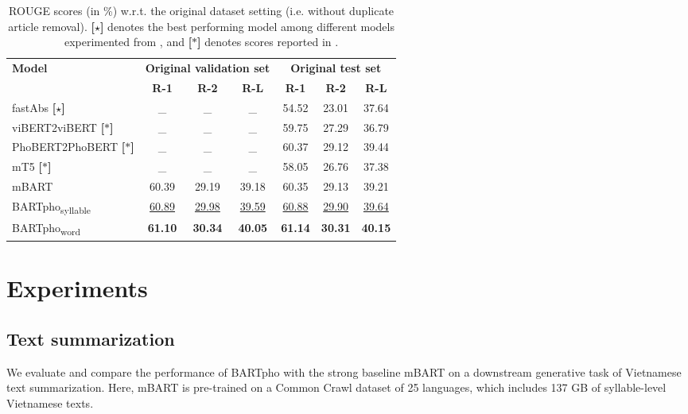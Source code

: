\documentclass[a4paper]{article}
\begin{document}
\begin{table*}[!t]
\centering
\caption{ROUGE scores (in \%) w.r.t. the original dataset setting (i.e.  {without} duplicate article removal). \textbf{[$\star$]} denotes the best performing model among different  models experimented from \cite{9023886}, and \textbf{[$\ast$]} denotes scores reported in \cite{vietsum}.}
\def\arraystretch{1.1}
\begin{tabular}{l|c|c|c|c|c|c}
\hline
\multirow{2}{*}{\textbf{Model}}  & \multicolumn{3}{c|}{\textbf{Original validation set}} & \multicolumn{3}{c}{\textbf{Original test set}}\\
\cline{2-7}
& \textbf{R-1} & \textbf{R-2}   & \textbf{R-L} & \textbf{R-1} & \textbf{R-2}   & \textbf{R-L} \\
\hline
fastAbs \textbf{[$\star$]} & \_ & \_ & \_ & 54.52 & 23.01 & 37.64 \\
viBERT2viBERT \textbf{[$\ast$]} & \_ & \_ & \_ & 59.75 & 27.29 & 36.79 \\
PhoBERT2PhoBERT \textbf{[$\ast$]} & \_ & \_ & \_ & {60.37} & {29.12} & {39.44} \\
mT5 \textbf{[$\ast$]} & \_ & \_ & \_ & 58.05 & 26.76 & 37.38\\
\hline
\hline 
mBART & 60.39 & 29.19 & 39.18 & 60.35 & 29.13 & 39.21\\
BARTpho\textsubscript{syllable} & \underline{60.89} & \underline{29.98} & \underline{39.59} & \underline{60.88} & \underline{29.90} & \underline{39.64}\\
BARTpho\textsubscript{word} & \textbf{61.10} & \textbf{30.34} & \textbf{40.05} & \textbf{61.14} & \textbf{30.31} & \textbf{40.15}\\
\hline
\end{tabular}
\label{tab:originaltest}
\end{table*}



\section{Experiments}

\subsection{Text summarization}\label{sec:sum}

We evaluate and compare the performance of BARTpho with the strong baseline mBART on a downstream generative task of Vietnamese text summarization. 
Here, mBART is pre-trained on a Common Crawl dataset of 25 languages, which includes 137 GB of syllable-level Vietnamese texts. 
\end{document}
